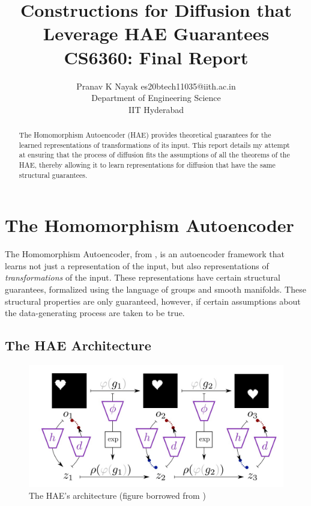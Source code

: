 \documentclass[10pt]{article} %
\title{%
  Constructions for Diffusion that Leverage HAE Guarantees \\ 
CS6360: Final Report
}
\author{\name Pranav K Nayak \email es20btech11035@iith.ac.in \\
      \addr Department of Engineering Science\\
    IIT Hyderabad}
\begin{document}
\maketitle

\begin{abstract}
  The Homomorphism Autoencoder (HAE) provides theoretical guarantees for the learned representations of transformations of its input. This report details my attempt at ensuring that the process of diffusion fits the assumptions of all the theorems of the HAE, thereby allowing it to learn representations for diffusion that have the same structural guarantees.
\end{abstract}

\section{The Homomorphism Autoencoder}


The Homomorphism Autoencoder, from \cite{keurti2023homomorphism}, is an autoencoder framework that learns not just a representation of the input, but also representations of \textit{transformations} of the input. These representations have certain structural guarantees, formalized using the language of groups and smooth manifolds. These structural properties are only guaranteed, however, if certain assumptions about the data-generating process are taken to be true. 

\subsection{The HAE Architecture}
\begin{figure}[h]
  \begin{center}
  \includegraphics[width=0.75\linewidth]{./hae_arch.jpeg}
  \end{center}
  \caption{The HAE's architecture (figure borrowed from \cite{keurti2023homomorphism})}
  \label{fig:hae_arch}
\end{figure}
\end{document}
